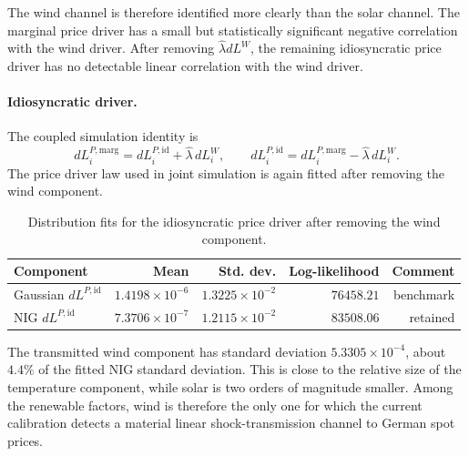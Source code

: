 The wind channel is therefore identified more clearly than the solar channel.
The marginal price driver has a small but statistically significant negative
correlation with the wind driver. After removing
\(\widehat\lambda dL^W\), the remaining idiosyncratic price driver has no
detectable linear correlation with the wind driver.

\paragraph{Idiosyncratic driver.}
The coupled simulation identity is
\begin{equation}
  dL_i^{P,\mathrm{marg}}
  =
  dL_i^{P,\mathrm{id}}
  +
  \widehat\lambda\,dL_i^W,
  \qquad
  dL_i^{P,\mathrm{id}}
  =
  dL_i^{P,\mathrm{marg}}
  -
  \widehat\lambda\,dL_i^W .
  \label{eq:wind-coupling-driver-decomposition}
\end{equation}
The price driver law used in joint simulation is again fitted after removing the
wind component.

\begin{table}[H]
  \centering
  \caption{Distribution fits for the idiosyncratic price driver after removing
  the wind component.}
  \label{tab:wind-price-idio-driver-fit}
  \begin{tabular}{@{}lrrrr@{}}
    \toprule
    Component & Mean & Std. dev. & Log-likelihood & Comment \\
    \midrule
    Gaussian \(dL^{P,\mathrm{id}}\)
    & \(1.4198{\times}10^{-6}\) & \(1.3225{\times}10^{-2}\)
    & \(76458.21\) & benchmark \\
    NIG \(dL^{P,\mathrm{id}}\)
    & \(7.3706{\times}10^{-7}\) & \(1.2115{\times}10^{-2}\)
    & \(83508.06\) & retained \\
    \bottomrule
  \end{tabular}
\end{table}

The transmitted wind component has standard deviation
\(5.3305{\times}10^{-4}\), about \(4.4\%\) of the fitted NIG standard deviation.
This is close to the relative size of the temperature component, while solar is
two orders of magnitude smaller. Among the renewable factors, wind is therefore
the only one for which the current calibration detects a material linear
shock-transmission channel to German spot prices.

\FloatBarrier
